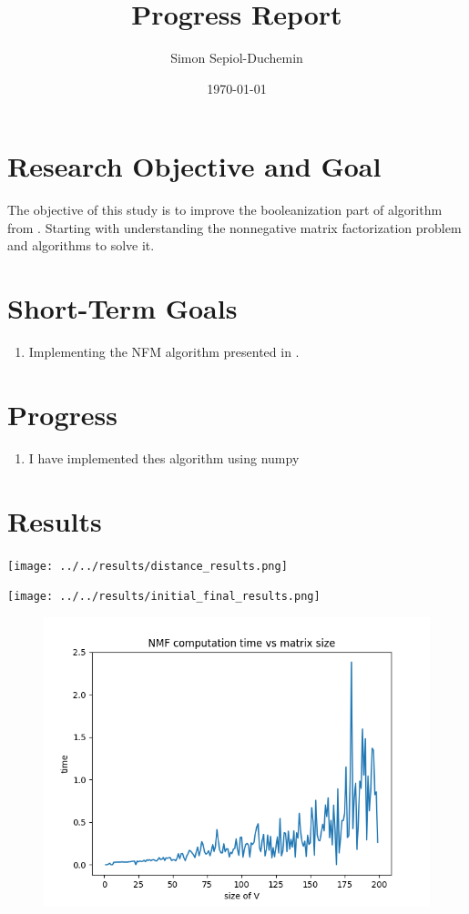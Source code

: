 \documentclass[a4paper,11pt]{article}
\title{Progress Report}
\author{Simon Sepiol-Duchemin}
\date{\today}
\begin{document}
%
\maketitle
\thispagestyle{empty}
%
\section{Research Objective and Goal}
The objective of this study is to improve the booleanization part of algorithm from \cite{9521203}. Starting with understanding the nonnegative matrix factorization problem and algorithms to solve it.
\section{Short-Term Goals}
\begin{enumerate}
\item Implementing the NFM algorithm presented in \cite{9521203}. 
\end{enumerate}
\section{Progress}
\begin{enumerate}
\item I have implemented thes algorithm using numpy 
\end{enumerate}

\section{Results}

    \begin{minipage}{0.45\textwidth}
        \centering
        \texttt{[image: ../../results/distance\_results.png]}
    \end{minipage}\hfill
    \begin{minipage}{0.45\textwidth}
        \centering
        \texttt{[image: ../../results/initial\_final\_results.png]}
    \end{minipage}
    
\begin{figure}[H]
    \begin{center}
        \includegraphics[scale=0.7]{../../results/time_results.png}  
    \end{center}
\end{figure}





\end{document}

